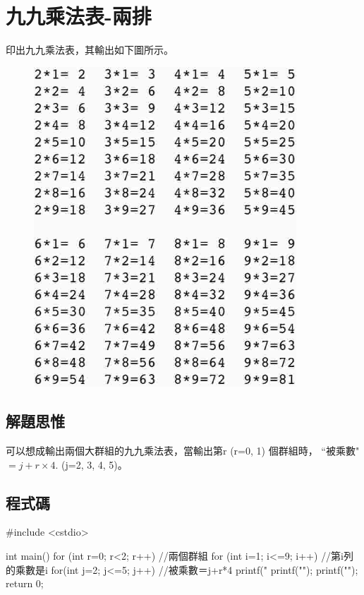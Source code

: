 \section{九九乘法表-兩排}
印出九九乘法表，其輸出如下圖所示。
\begin{figure}[H]
	\centering
	\includegraphics[height=12cm]{../solutions/fig/JA007fig}
\end{figure}

\subsection{解題思惟}
可以想成輸出兩個大群組的九九乘法表，當輸出第r (r=0, 1) 個群組時，
``被乘數"$=j+r\times4.$ (j=2, 3, 4, 5)。
			
\subsection{程式碼}
\begin{cppcode}
#include <cstdio>

int main()
{
	for (int r=0; r<2; r++) { //兩個群組
		for (int i=1; i<=9; i++) { //第i列的乘數是i
			for(int j=2; j<=5; j++) { //被乘數＝j+r*4
				printf("%
			}
			printf("\n");
		}
		printf("\n");
	}
	return 0;
}
\end{cppcode}
